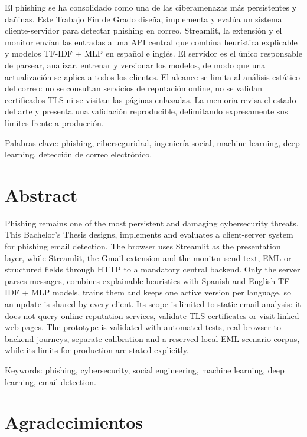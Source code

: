 \documentclass[11pt,a4paper,oneside]{report}
\begin{document}
El phishing se ha consolidado como una de las ciberamenazas más persistentes y dañinas. Este Trabajo Fin de Grado diseña, implementa y evalúa un sistema cliente-servidor para detectar phishing en correo. Streamlit, la extensión y el monitor envían las entradas a una API central que combina heurística explicable y modelos TF-IDF + MLP en español e inglés. El servidor es el único responsable de parsear, analizar, entrenar y versionar los modelos, de modo que una actualización se aplica a todos los clientes. El alcance se limita al análisis estático del correo: no se consultan servicios de reputación online, no se validan certificados TLS ni se visitan las páginas enlazadas. La memoria revisa el estado del arte y presenta una validación reproducible, delimitando expresamente sus límites frente a producción.

Palabras clave: phishing, ciberseguridad, ingeniería social, machine learning, deep learning, detección de correo electrónico.

\chapter*{Abstract}

Phishing remains one of the most persistent and damaging cybersecurity threats. This Bachelor's Thesis designs, implements and evaluates a client-server system for phishing email detection. The browser uses Streamlit as the presentation layer, while Streamlit, the Gmail extension and the monitor send text, EML or structured fields through HTTP to a mandatory central backend. Only the server parses messages, combines explainable heuristics with Spanish and English TF-IDF + MLP models, trains them and keeps one active version per language, so an update is shared by every client. Its scope is limited to static email analysis: it does not query online reputation services, validate TLS certificates or visit linked web pages. The prototype is validated with automated tests, real browser-to-backend journeys, separate calibration and a reserved local EML scenario corpus, while its limits for production are stated explicitly.

Keywords: phishing, cybersecurity, social engineering, machine learning, deep learning, email detection.

\chapter*{Agradecimientos}
\end{document}
